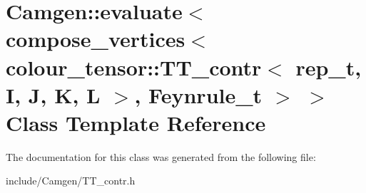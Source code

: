 \hypertarget{a00177}{}\section{Camgen\+:\+:evaluate$<$ compose\+\_\+vertices$<$ colour\+\_\+tensor\+:\+:T\+T\+\_\+contr$<$ rep\+\_\+t, I, J, K, L $>$, Feynrule\+\_\+t $>$ $>$ Class Template Reference}
\label{a00177}


The documentation for this class was generated from the following file\+:\begin{DoxyCompactItemize}
\item 
include/\+Camgen/T\+T\+\_\+contr.\+h\end{DoxyCompactItemize}
